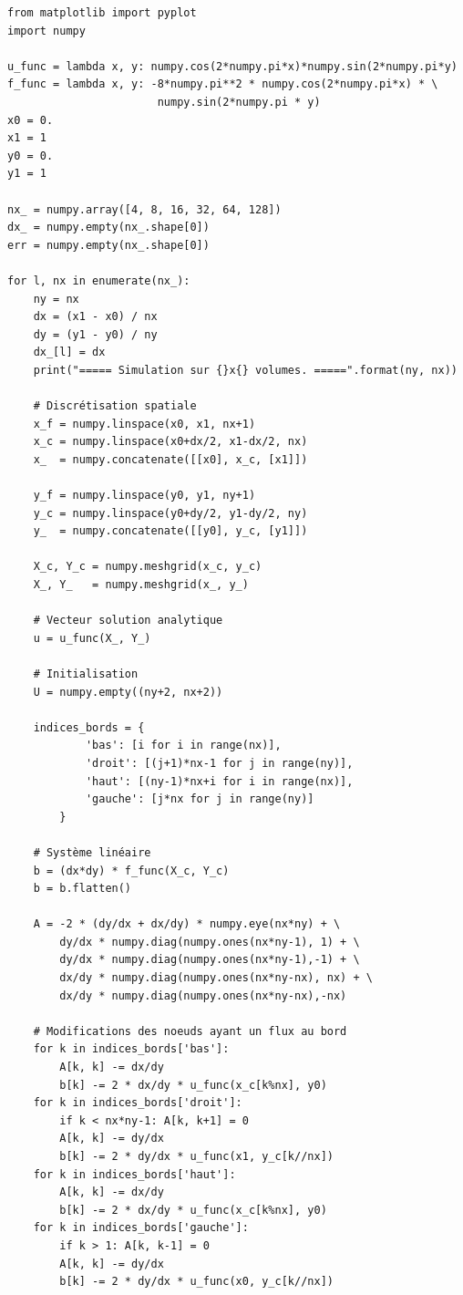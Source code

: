 \begin{verbatim}
from matplotlib import pyplot
import numpy

u_func = lambda x, y: numpy.cos(2*numpy.pi*x)*numpy.sin(2*numpy.pi*y)
f_func = lambda x, y: -8*numpy.pi**2 * numpy.cos(2*numpy.pi*x) * \
                       numpy.sin(2*numpy.pi * y)
x0 = 0.
x1 = 1
y0 = 0.
y1 = 1

nx_ = numpy.array([4, 8, 16, 32, 64, 128])
dx_ = numpy.empty(nx_.shape[0])
err = numpy.empty(nx_.shape[0])

for l, nx in enumerate(nx_):
    ny = nx
    dx = (x1 - x0) / nx
    dy = (y1 - y0) / ny
    dx_[l] = dx
    print("===== Simulation sur {}x{} volumes. =====".format(ny, nx))
    
    # Discrétisation spatiale
    x_f = numpy.linspace(x0, x1, nx+1)
    x_c = numpy.linspace(x0+dx/2, x1-dx/2, nx)
    x_  = numpy.concatenate([[x0], x_c, [x1]])
    
    y_f = numpy.linspace(y0, y1, ny+1)
    y_c = numpy.linspace(y0+dy/2, y1-dy/2, ny)
    y_  = numpy.concatenate([[y0], y_c, [y1]])
    
    X_c, Y_c = numpy.meshgrid(x_c, y_c)
    X_, Y_   = numpy.meshgrid(x_, y_)
    
    # Vecteur solution analytique
    u = u_func(X_, Y_)
    
    # Initialisation
    U = numpy.empty((ny+2, nx+2))
    
    indices_bords = {
            'bas': [i for i in range(nx)],
            'droit': [(j+1)*nx-1 for j in range(ny)],
            'haut': [(ny-1)*nx+i for i in range(nx)],
            'gauche': [j*nx for j in range(ny)]
        }
    
    # Système linéaire
    b = (dx*dy) * f_func(X_c, Y_c)
    b = b.flatten()
    
    A = -2 * (dy/dx + dx/dy) * numpy.eye(nx*ny) + \
        dy/dx * numpy.diag(numpy.ones(nx*ny-1), 1) + \
        dy/dx * numpy.diag(numpy.ones(nx*ny-1),-1) + \
        dx/dy * numpy.diag(numpy.ones(nx*ny-nx), nx) + \
        dx/dy * numpy.diag(numpy.ones(nx*ny-nx),-nx)
        
    # Modifications des noeuds ayant un flux au bord
    for k in indices_bords['bas']:
        A[k, k] -= dx/dy
        b[k] -= 2 * dx/dy * u_func(x_c[k%nx], y0)
    for k in indices_bords['droit']:
        if k < nx*ny-1: A[k, k+1] = 0
        A[k, k] -= dy/dx
        b[k] -= 2 * dy/dx * u_func(x1, y_c[k//nx])
    for k in indices_bords['haut']:
        A[k, k] -= dx/dy
        b[k] -= 2 * dx/dy * u_func(x_c[k%nx], y0)
    for k in indices_bords['gauche']:
        if k > 1: A[k, k-1] = 0
        A[k, k] -= dy/dx
        b[k] -= 2 * dy/dx * u_func(x0, y_c[k//nx])
        

\end{verbatim}
